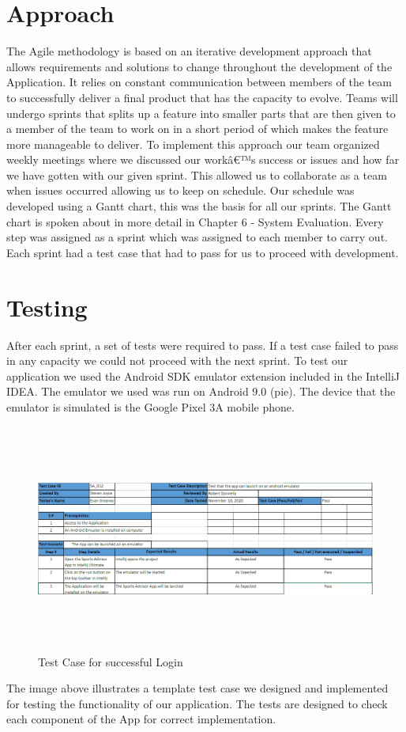 \section{Approach}
The Agile methodology is based on an iterative development approach that allows requirements and solutions to change throughout the development of the Application. It relies on constant communication between members of the team to successfully deliver a final product that has the capacity to evolve. Teams will undergo sprints that splits up a feature into smaller parts that are then given to a member of the team to work on in a short period of which makes the feature more manageable to deliver.
\newline
\newline
To implement this approach our team organized weekly meetings where we discussed our workâ€™s success or issues and how far we have gotten with our given sprint. This allowed us to collaborate as a team when issues occurred allowing us to keep on schedule. Our schedule was developed using a Gantt chart, this was the basis for all our sprints. The Gantt chart is spoken about in more detail in Chapter 6 - System Evaluation. Every step was assigned as a sprint which was assigned to each member to carry out. Each sprint had a test case that had to pass for us to proceed with development.
\section{Testing}
After each sprint, a set of tests were required to pass. If a test case failed to pass in any capacity we could not proceed with the next sprint. To test our application we used the Android SDK emulator extension included in the IntelliJ IDEA. The emulator we used was run on Android 9.0 (pie). The device that the emulator is simulated is the Google Pixel 3A mobile phone.
\begin{figure}[H]
    \centering
    \includegraphics[width=15cm, height = 7.5cm]{img/EmulatorLaunch.PNG}
    \caption{Test Case for successful Login}
    \label{fig:emulator launch}
\end{figure}
The image above illustrates a template test case we designed and implemented for testing the functionality of our application. The tests are designed to check each component of the App for correct implementation.

